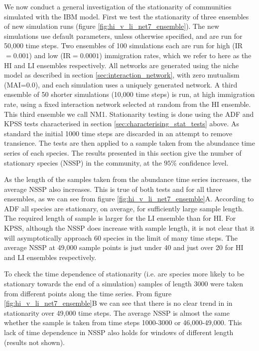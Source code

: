 We now conduct a general investigation of the stationarity of communities simulated with the IBM model. First we test the stationarity of three ensembles of new simulation runs (figure \ref{fig:hi_v_li_net7_ensemble}). The new simulations use default parameters, unless otherwise specified, and are run for 50,000 time steps. Two ensembles of 100 simulations each are run for high (IR$=0.001$) and low (IR$=0.0001$) immigration rates, which we refer to here as the HI and LI ensembles respectively. All networks are generated using the niche model as described in section \ref{sec:interaction_network}, with zero mutualism (MAI=$0.0$), and each simulation uses a uniquely generated network. A third ensemble of 50 shorter simulations (10,000 time steps) is run, at high immigration rate, using a fixed interaction network selected at random from the HI ensemble. This third ensemble we call NM1. Stationarity testing is done using the ADF and KPSS tests characterised in section \ref{sec:characterising_stat_tests} above. As standard the initial 1000 time steps are discarded in an attempt to remove transience. The tests are then applied to a sample taken from the abundance time series of each species. The results presented in this section give the number of stationary species (NSSP) in the community, at the $95\%$ confidence level.

As the length of the samples taken from the abundance time series increases, the average NSSP also increases. This is true of both tests and for all three ensembles, as we can see from figure \ref{fig:hi_v_li_net7_ensemble}A. According to ADF all species are stationary, on average, for sufficiently large sample length. The required length of sample is larger for the LI ensemble than for HI. For KPSS, although the NSSP does increase with sample length, it is not clear that it will asymptotically approach 60 species in the limit of many time steps. The average NSSP at 49,000 sample points is just under 40 and just over 20 for HI and LI ensembles respectively.

To check the time dependence of stationarity (i.e. are species more likely to be stationary towards the end of a simulation) samples of length 3000 were taken from different points along the time series. From figure \ref{fig:hi_v_li_net7_ensemble}B we can see that there is no clear trend in in stationarity over 49,000 time steps. The average NSSP is almost the same whether the sample is taken from time steps 1000-3000 or 46,000-49,000. This lack of time dependence in NSSP also holds for windows of different length (results not shown).

